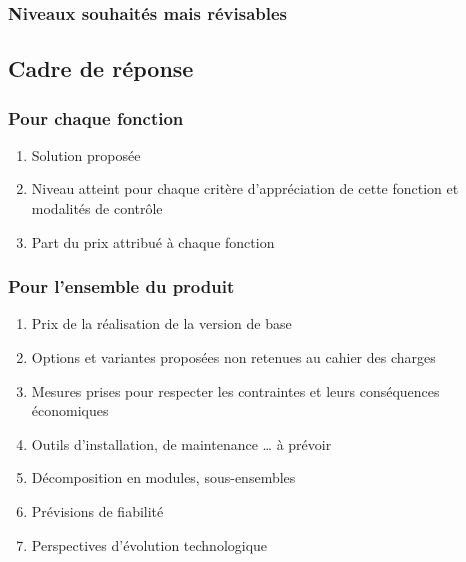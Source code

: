 \documentclass[10pt,a4paper]{article}
\begin{document}
\subsubsection{Niveaux souhaités mais révisables}

\subsection{Cadre de réponse}

\subsubsection{Pour chaque fonction}
\begin{enumerate}
\item{Solution proposée}
\item{Niveau atteint pour chaque critère d’appréciation de cette fonction et modalités de contrôle}
\item{Part du prix attribué à chaque fonction}
\end{enumerate}

\subsubsection{Pour l’ensemble du produit}
\begin{enumerate}
\item{Prix de la réalisation de la version de base}
\item{Options et variantes proposées non retenues au cahier des charges}
\item{Mesures prises pour respecter les contraintes et leurs conséquences économiques}
\item{Outils d’installation, de maintenance … à prévoir}
\item{Décomposition en modules, sous-ensembles}
\item{Prévisions de fiabilité}
\item{ Perspectives d’évolution technologique}
\end{enumerate}
\end{document}

